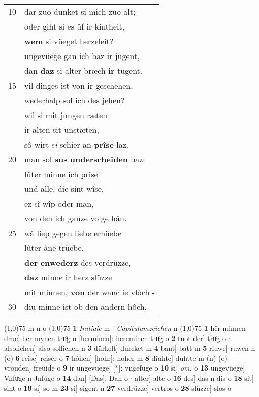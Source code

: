 \documentclass[8pt,a4paper,notitlepage]{article}
\begin{document}
\begin{table}[ht]
\begin{minipage}[t]{0.5\linewidth}
\begin{tabular}{rl}
10 & dar zuo dunket si mich zuo alt;\\ 
 & oder giht si es ûf ir kintheit,\\ 
 & \textbf{wem} si vüeget herzeleit?\\ 
 & ungevüege gan ich baz ir jugent,\\ 
 & dan \textbf{daz} si alter bræch \textbf{ir} tugent.\\ 
15 & vil dinges ist von ir geschehen.\\ 
 & wederhalp sol ich des jehen?\\ 
 & wil si mit jungen ræten\\ 
 & ir alten sit unstæten,\\ 
 & sô wirt s\textit{i} schier an \textbf{prîse} laz.\\ 
20 & man sol \textbf{sus} \textbf{underscheiden} baz:\\ 
 & lûter minne ich prîse\\ 
 & und alle, die sint wîse,\\ 
 & ez sî wîp oder man,\\ 
 & von den ich ganze volge hân.\\ 
25 & wâ liep gegen liebe erhüebe\\ 
 & lûter âne trüebe,\\ 
 & \textbf{der} \textbf{enwederz} des verdrüzze,\\ 
 & \textbf{daz} minne ir herz slüzze\\ 
 & mit minnen, \textbf{von} der wanc ie vlôch -\\ 
30 & diu minne ist ob den andern hôch.\\ 
\end{tabular}
\scriptsize
\line(1,0){75} \newline
m n o \newline
\line(1,0){75} \newline
\textbf{1} \textit{Initiale} m   $\cdot$ \textit{Capitulumzeichen} n  \newline
\line(1,0){75} \newline
\textbf{1} hêr minnen druc] her mynen truͦg n [herminen]: hereminen truͦg o \textbf{2} tuot der] truͦg o  $\cdot$ alsolichen] also sollichen n \textbf{3} dürkelt] durcket m \textbf{4} bant] batt m \textbf{5} riuwe] ruwen n (o) \textbf{6} reise] reiser o \textbf{7} hôhen] [hohr]: hoher m \textbf{8} diuhte] duhtte m (n) (o)  $\cdot$ vröuden] freuide o \textbf{9} ir ungevüege] [*]: vngefuge o \textbf{10} si] \textit{om.} o \textbf{13} ungevüege] Vnfuͯge n Jnfúge o \textbf{14} dan] [Das]: Dan o  $\cdot$ alter] alte o \textbf{16} des] das n dis o \textbf{18} sit] sint o \textbf{19} si] so m \textbf{23} sî] sigent n \textbf{27} verdrüzze] vertros o \textbf{28} slüzze] slos o \newline
\end{minipage}
\end{table}
\end{document}
